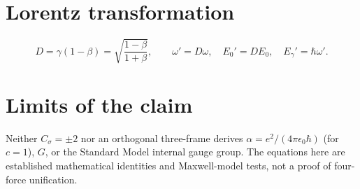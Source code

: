 \documentclass[11pt]{article}
\begin{document}
\section*{Lorentz transformation}
\begin{equation}
D=\gamma(1-\beta)=\sqrt{\frac{1-\beta}{1+\beta}},\qquad
\omega'=D\omega,\quad E_0'=DE_0,\quad E_\gamma'=\hbar\omega'.
\end{equation}
\section*{Limits of the claim}
Neither $C_\sigma=\pm2$ nor an orthogonal three-frame derives
$\alpha=e^2/(4\pi\epsilon_0\hbar)$ (for $c=1$), $G$, or the Standard Model
internal gauge group.  The equations here are established mathematical
identities and Maxwell-model tests, not a proof of four-force unification.
\end{document}
